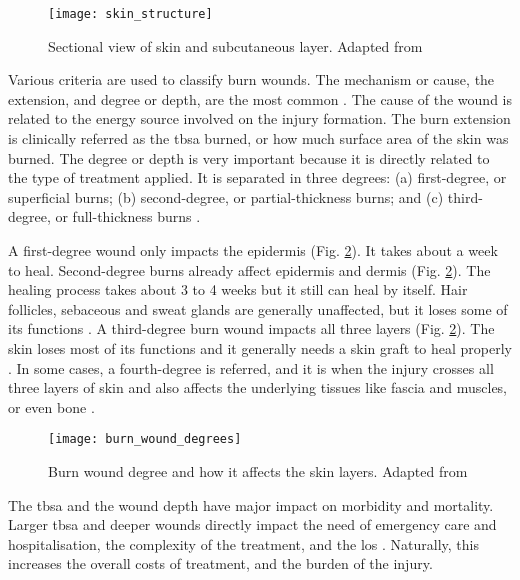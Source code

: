 \begin{figure}[htbp]
	\centering
	\texttt{[image: skin\_structure]}
	\caption[Sectional view of skin and subcutaneous layer.]{Sectional view of skin and subcutaneous layer. Adapted from \cite{Tortora2009_principles_anatomy_physiology}}
	\label{fig:skin_structure}
\end{figure}

Various criteria are used to classify burn wounds. The mechanism or cause, the extension, and degree or depth, are the most common \cite{who_unicef2008_burns_chapter}. The cause of the wound is related to the energy source involved on the injury formation. The burn extension is clinically referred as the \gls{tbsa} burned, or how much surface area of the skin was burned. The degree or depth is very important because it is directly related to the type of treatment applied. It is separated in three degrees: (a) first-degree, or superficial burns; (b) second-degree, or partial-thickness burns; and (c) third-degree, or full-thickness burns \cite{who_unicef2008_burns_chapter}. 

A first-degree wound only impacts the epidermis (Fig. \ref{fig:burn_wound_degrees}). It takes about a week to heal. Second-degree burns already affect epidermis and dermis (Fig. \ref{fig:burn_wound_degrees}). The healing process takes about 3 to 4 weeks but it still can heal by itself. Hair follicles, sebaceous and sweat glands are generally unaffected, but it loses some of its functions \cite{Tortora2009_principles_anatomy_physiology}. A third-degree burn wound impacts all three layers (Fig. \ref{fig:burn_wound_degrees}). The skin loses most of its functions \cite{Tortora2009_principles_anatomy_physiology} and it generally needs a skin graft to heal properly \cite{who_unicef2008_burns_chapter}. In some cases, a fourth-degree is referred, and it is when the injury crosses all three layers of skin and also affects the underlying tissues like fascia and muscles, or even bone \cite{Vijayavenkataraman2016_stateart_modelling_materials_processing}.

\begin{figure}[htbp]
	\centering
	\texttt{[image: burn\_wound\_degrees]}
	\caption[Burn wound degree and how it affects the skin layers.]{Burn wound degree and how it affects the skin layers. Adapted from \cite{Tortora2009_principles_anatomy_physiology}}
	\label{fig:burn_wound_degrees}
\end{figure}

The \gls{tbsa} and the wound depth have major impact on morbidity and mortality. Larger \gls{tbsa} and deeper wounds directly impact the need of emergency care and hospitalisation, the complexity of the treatment, and the \gls{los} \cite{Santos_2016_burden_burns_portugal, Bartosch_2013_mortality_lengthofstay}. Naturally, this increases the overall costs of treatment, and the burden of the injury. 


